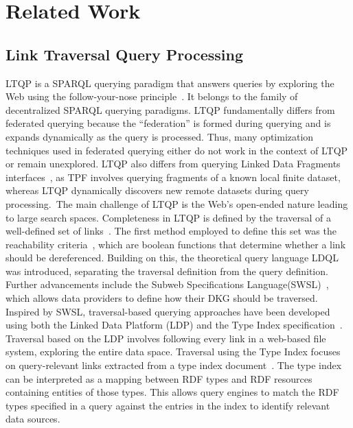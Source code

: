 \section{Related Work}\label{sec:related_work}

\subsection{Link Traversal Query Processing}
LTQP is a SPARQL querying paradigm that answers queries by exploring the Web using the follow-your-nose principle~\cite{hartig2016walking}.
It belongs to the family of decentralized SPARQL querying paradigms.
LTQP fundamentally differs from federated querying because the ``federation'' is formed during querying and is expands dynamically as the query is processed.
Thus, many optimization techniques used in federated querying either do not work in the context of LTQP or remain unexplored.
LTQP also differs from querying Linked Data Fragments interfaces~\cite{azzam2020smart,azzam2021wisekg, DBLP:journals/corr/HartigA16}, as TPF involves querying fragments of a known local finite dataset, whereas LTQP dynamically discovers new remote datasets during query processing.\
The main challenge of LTQP is the Web's open-ended nature leading to large search spaces.
Completeness in LTQP is defined by the traversal of a well-defined set of links~\cite{Hartig2012}.
The first method employed to define this set was the reachability criteria~\cite{Hartig2012}, which are boolean functions that determine whether a link should be dereferenced.
Building on this, the theoretical query language LDQL~\cite{hartigLDQL} was introduced, separating the traversal definition from the query definition.
Further advancements include the Subweb Specifications Language(SWSL)~\cite{Bogaerts2021LinkTW}, which allows data providers to define how their DKG should be traversed.
Inspired by SWSL, traversal-based querying approaches have been developed using both the Linked Data Platform (LDP) and the Type Index specification~\cite{Taelman2023}.  
Traversal based on the LDP involves following every link in a web-based file system, exploring the entire data space.  
Traversal using the Type Index focuses on query-relevant links extracted from a type index document~\cite{solidTypeIndexes}.  
The type index can be interpreted as a mapping between RDF types and RDF resources containing entities of those types.  
This allows query engines to match the RDF types specified in a query against the entries in the index to identify relevant data sources.
